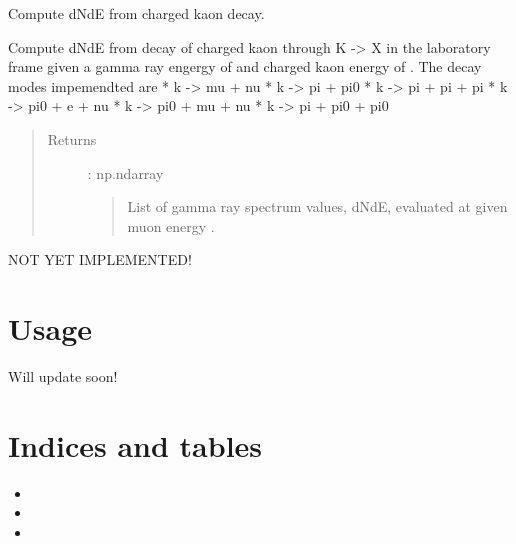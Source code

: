 \documentclass[letterpaper,10pt,english]{sphinxmanual}
\begin{document}
\begin{fulllineitems}
Compute dNdE from charged kaon decay.

Compute dNdE from decay of charged kaon through K -\textgreater{} X in the
laboratory frame given a gamma ray engergy of  and charged
kaon energy of . The decay modes impemendted are
* k -\textgreater{} mu  + nu
* k -\textgreater{} pi  + pi0
* k -\textgreater{} pi  + pi  + pi
* k -\textgreater{} pi0 + e   + nu
* k -\textgreater{} pi0 + mu  + nu
* k -\textgreater{} pi  + pi0 + pi0
\begin{quote}\begin{description}
\item[{Returns}] \leavevmode
{} : np.ndarray
\begin{quote}

List of gamma ray spectrum values, dNdE, evaluated at 
given muon energy .
\end{quote}

\end{description}\end{quote}

\end{fulllineitems}


\begin{fulllineitems}
NOT YET IMPLEMENTED!

\end{fulllineitems}



\chapter{Usage}
\label{\detokenize{usage:usage}}\label{\detokenize{usage::doc}}
Will update soon!


\chapter{Indices and tables}
\label{\detokenize{index:indices-and-tables}}\begin{itemize}
\item {} 

\item {} 

\item {} 

\end{itemize}
\end{document}
